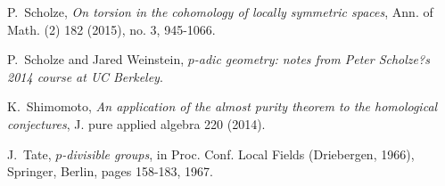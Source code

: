 \documentclass[10pt,reqno]{amsart}
\begin{document}
\begin{thebibliography}{HKM}
P.~Scholze, \emph{On torsion in the cohomology of locally symmetric spaces}, Ann. of Math. (2) 182 (2015), no. 3, 945-1066. 

P.~Scholze and Jared Weinstein, \emph{$p$-adic geometry: notes from Peter Scholze?s 2014 course at UC Berkeley}.

K.~Shimomoto, \emph{An application of the almost purity theorem to the homological conjectures}, J. pure applied algebra 220 (2014).


J.~Tate, \emph{$p$-divisible groups}, in Proc. Conf. Local Fields (Driebergen, 1966), Springer, Berlin, pages 158-183, 1967.

\end{thebibliography}
\end{document}
